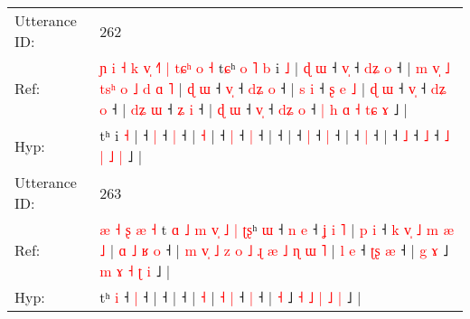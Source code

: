 \documentclass[10pt]{article}
\DeclareRobustCommand{\hl}[1]{{\textcolor{red}{#1}}}
\begin{document}
\begin{longtable}{ll}
 \\
\midrule
Utterance ID: & 262 \\
Ref: & \hl{ɲ}\hl{ }\hl{i}\hl{ }\hl{˧}\hl{ }\hl{k}\hl{ }\hl{v}\hl{̩}\hl{ }\hl{˧}\hl{˥}\hl{ }\hl{|}\hl{ }\hl{t}\hl{ɕ}\hl{ʰ}\hl{ }\hl{o}\hl{ }\hl{˧}\hl{ }t\hl{ɕ}ʰ\hl{ }\hl{o}\hl{ }\hl{˥}\hl{ }\hl{b} i \hl{˩} |\hl{ }\hl{ɖ}\hl{ }\hl{ɯ} ˧ \hl{v}\hl{̩} ˧\hl{ }\hl{d}\hl{ʑ} \hl{o} ˧ |\hl{ }\hl{m}\hl{ }\hl{v}\hl{̩}\hl{ }\hl{˩}\hl{ }\hl{t}\hl{s}\hl{ʰ}\hl{ }\hl{o}\hl{ }\hl{˩}\hl{ }\hl{d}\hl{ }\hl{ɑ} \hl{˥} |\hl{ }\hl{ɖ}\hl{ }\hl{ɯ} ˧ \hl{v}\hl{̩} ˧\hl{ }\hl{d}\hl{ʑ} \hl{o} ˧ |\hl{ }\hl{s}\hl{ }\hl{i} ˧\hl{ }\hl{ʂ}\hl{ }\hl{e}\hl{ }\hl{˩} |\hl{ }\hl{ɖ}\hl{ }\hl{ɯ} ˧ \hl{v}\hl{̩} ˧\hl{ }\hl{d}\hl{ʑ} \hl{o} ˧ |\hl{ }\hl{d}\hl{ʑ}\hl{ }\hl{ɯ} ˧\hl{ }\hl{ʑ} \hl{i} ˧ |\hl{ }\hl{ɖ}\hl{ }\hl{ɯ} ˧ \hl{v}\hl{̩} ˧\hl{ }\hl{d}\hl{ʑ} \hl{o} ˧\hl{ }\hl{|}\hl{ }\hl{h} \hl{ɑ} \hl{˧} \hl{t}\hl{ɕ} \hl{ɤ} ˩ |
 \\
Hyp: & \hl{}\hl{}\hl{}\hl{}\hl{}\hl{}\hl{}\hl{}\hl{}\hl{}\hl{}\hl{}\hl{}\hl{}\hl{}\hl{}\hl{}\hl{}\hl{}\hl{}\hl{}\hl{}\hl{}\hl{}t\hl{}ʰ\hl{}\hl{}\hl{}\hl{}\hl{}\hl{} i \hl{˧} |\hl{}\hl{}\hl{}\hl{} ˧ \hl{}\hl{|} ˧\hl{}\hl{}\hl{} \hl{|} ˧ |\hl{}\hl{}\hl{}\hl{}\hl{}\hl{}\hl{}\hl{}\hl{}\hl{}\hl{}\hl{}\hl{}\hl{}\hl{}\hl{}\hl{}\hl{}\hl{} \hl{˧} |\hl{}\hl{}\hl{}\hl{} ˧ \hl{}\hl{|} ˧\hl{}\hl{}\hl{} \hl{|} ˧ |\hl{}\hl{}\hl{}\hl{} ˧\hl{}\hl{}\hl{}\hl{}\hl{}\hl{} |\hl{}\hl{}\hl{}\hl{} ˧ \hl{}\hl{|} ˧\hl{}\hl{}\hl{} \hl{|} ˧ |\hl{}\hl{}\hl{}\hl{}\hl{} ˧\hl{}\hl{} \hl{|} ˧ |\hl{}\hl{}\hl{}\hl{} ˧ \hl{}\hl{˩} ˧\hl{}\hl{}\hl{} \hl{˩} ˧\hl{}\hl{}\hl{}\hl{} \hl{˩} \hl{|} \hl{}\hl{˩} \hl{|} ˩ |
 \\
\midrule
Utterance ID: & 263 \\
Ref: & \hl{æ}\hl{ }\hl{˧}\hl{ }\hl{ʂ}\hl{ }\hl{æ}\hl{ }\hl{˧}\hl{ }t\hl{ }\hl{ɑ}\hl{ }\hl{˩}\hl{ }\hl{m}\hl{ }\hl{v}\hl{̩}\hl{ }\hl{˩}\hl{ }\hl{|}\hl{ }\hl{ʈ}\hl{ʂ}ʰ \hl{ɯ} ˧\hl{ }\hl{n} \hl{e} ˧\hl{ }\hl{ʝ}\hl{ }\hl{i}\hl{ }\hl{˥} |\hl{ }\hl{p}\hl{ }\hl{i} ˧\hl{ }\hl{k}\hl{ }\hl{v}\hl{̩}\hl{ }\hl{˩}\hl{ }\hl{m}\hl{ }\hl{æ}\hl{ }\hl{˩} |\hl{ }\hl{ɑ}\hl{ }\hl{˩}\hl{ }\hl{ʁ}\hl{ }\hl{o} ˧ |\hl{ }\hl{m}\hl{ }\hl{v}\hl{̩}\hl{ }\hl{˩}\hl{ }\hl{z}\hl{ }\hl{o}\hl{ }\hl{˩}\hl{ }\hl{ɻ}\hl{ }\hl{æ}\hl{ }\hl{˩}\hl{ }\hl{ɳ}\hl{ }\hl{ɯ} \hl{˥} | \hl{l} \hl{e} ˧\hl{ }\hl{ʈ}\hl{ʂ} \hl{æ} ˧ |\hl{ }\hl{g} \hl{ɤ} ˩ \hl{m} \hl{ɤ} \hl{˧} \hl{ʈ} \hl{i} ˩ |
 \\
Hyp: & \hl{}\hl{}\hl{}\hl{}\hl{}\hl{}\hl{}\hl{}\hl{}\hl{}t\hl{}\hl{}\hl{}\hl{}\hl{}\hl{}\hl{}\hl{}\hl{}\hl{}\hl{}\hl{}\hl{}\hl{}\hl{}\hl{}ʰ \hl{i} ˧\hl{}\hl{} \hl{|} ˧\hl{}\hl{}\hl{}\hl{}\hl{}\hl{} |\hl{}\hl{}\hl{}\hl{} ˧\hl{}\hl{}\hl{}\hl{}\hl{}\hl{}\hl{}\hl{}\hl{}\hl{}\hl{}\hl{}\hl{} |\hl{}\hl{}\hl{}\hl{}\hl{}\hl{}\hl{}\hl{} ˧ |\hl{}\hl{}\hl{}\hl{}\hl{}\hl{}\hl{}\hl{}\hl{}\hl{}\hl{}\hl{}\hl{}\hl{}\hl{}\hl{}\hl{}\hl{}\hl{}\hl{}\hl{}\hl{}\hl{} \hl{˧} | \hl{˧} \hl{|} ˧\hl{}\hl{}\hl{} \hl{|} ˧ |\hl{}\hl{} \hl{˧} ˩ \hl{˧} \hl{˩} \hl{|} \hl{˩} \hl{|} ˩ |

\end{longtable}
\end{document}
